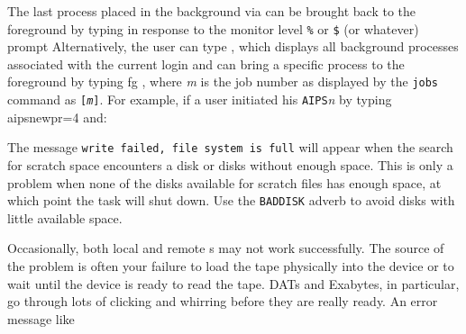      The last process placed in the background via {\tt {}}
can be brought back to the foreground by typing {\us {} \CR} in
response to the monitor level {\tt \%} or {\tt \$} (or whatever) prompt
Alternatively, the user can type {\us\qs {} \CR}, which
displays all background processes associated with the current login
and can bring a specific process to the foreground by typing {\us
fg \CR}, where {\it m\/} is the job number as
displayed by the {\tt jobs} command as {\tt [{\it m\/}]}.  For
example, if a user initiated his {\tt AIPS}{\it n\/} by typing {\us
aips\qs new\qs pr=4\CR} and:
\pd


     The message {\tt write failed, file system is full} will appear
when the search for scratch space encounters a disk or disks without
enough space.  This is only a problem when none of the disks available
for scratch files has enough space, at which point the task will shut
down.  Use the {\tt BADDISK} adverb to avoid disks with little
available space.


   Occasionally, both local and remote s may not work
successfully.  The source of the problem is often your failure to load
the tape physically into the device or to wait until the device is
ready to read the tape.  DATs and Exabytes, in particular, go through
lots of clicking and whirring before they are really ready.  An error
message like

